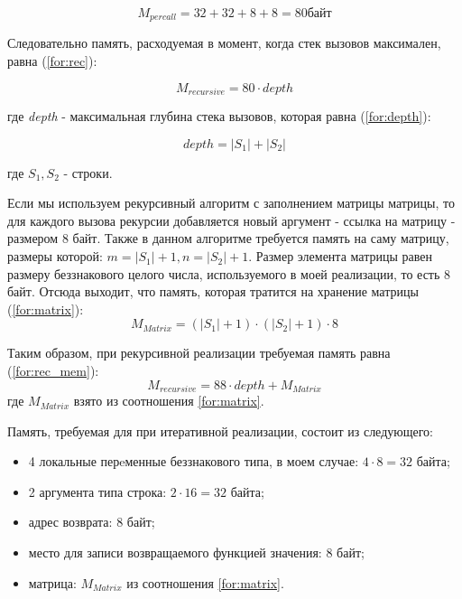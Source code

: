 \documentclass[a4paper,14pt, unknownkeysallowed]{extreport}
\begin{document}
\begin{equation}
M_{per call} = 32 + 32 + 8 + 8 = 80 байт
\label{for:onecall}
\end{equation}

Следовательно память, расходуемая в момент, когда стек вызовов максимален, равна (\ref{for:rec}): 

\begin{equation}
    M_{recursive} = 80 \cdot depth
\label{for:rec}
\end{equation}

где \textit{depth} - максимальная глубина стека вызовов, которая равна (\ref{for:depth}):

\begin{equation}
depth = |S_1| + |S_2|
\label{for:depth}
\end{equation}

где $S_1, S_2$ - строки.

Если мы используем рекурсивный алгоритм с заполнением матрицы матрицы, то для каждого вызова рекурсии добавляется новый аргумент - ссылка на матрицу - размером $8$ байт. Также в данном алгоритме требуется память на саму матрицу, размеры которой: $m = |S_1| + 1, n = |S_2| + 1$. Размер элемента матрицы равен размеру беззнакового целого числа, используемого в моей реализации, то есть $8$ байт. Отсюда выходит, что память, которая тратится на хранение матрицы (\ref{for:matrix}):
\begin{equation}
M_{Matrix} = (|S_1| + 1) \cdot (|S_2| + 1) \cdot 8
\label{for:matrix}
\end{equation}

Таким образом, при рекурсивной реализации требуемая память равна (\ref{for:rec_mem}):
\begin{equation}
M_{recursive} = 88 \cdot depth + M_{Matrix}
\label{for:rec_mem}
\end{equation}
где $M_{Matrix}$ взято из соотношения \ref{for:matrix}.

Память, требуемая для при итеративной реализации, состоит из следующего:
\begin{itemize}
    \item 4 локальные перeменные беззнакового типа, в моем случае: $4 \cdot 8 = 32$ байта;
    \item 2 аргумента типа строка: $2 \cdot 16 = 32$ байта;
    \item адрес возврата: 8 байт;
    \item место для записи возвращаемого функцией значения: 8 байт;
    \item матрица: $M_{Matrix}$ из соотношения \ref{for:matrix}.
\end{itemize}
\end{document}
